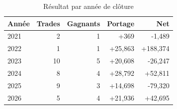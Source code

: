 \begin{table}[H]
\centering
\begin{tabular}{@{}lrrrr@{}}
\toprule
Année & Trades & Gagnants & Portage & Net \\
\midrule
2021 & 2 & 1 & +369 & -1,489 \\
2022 & 1 & 1 & +25,863 & +188,374 \\
2023 & 10 & 5 & +20,608 & -26,247 \\
2024 & 8 & 4 & +28,792 & +52,811 \\
2025 & 9 & 3 & +14,698 & -79,320 \\
2026 & 5 & 4 & +21,936 & +42,695 \\
\bottomrule
\end{tabular}
\caption{Résultat par année de clôture}
\end{table}
